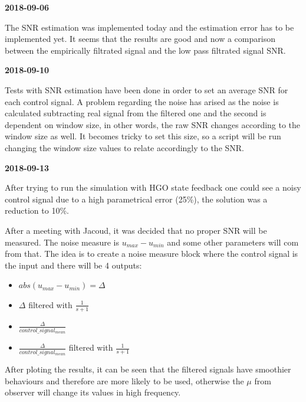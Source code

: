 \textbf{2018-09-06}

The SNR estimation was implemented today and the estimation error has to be implemented yet. It seems that the results are good and now a comparison between the empirically filtrated signal and the low pass filtrated signal SNR.

\textbf{2018-09-10}

Tests with SNR estimation have been done in order to set an average SNR for each control signal. A problem regarding the noise has arised as the noise is calculated subtracting real signal from the filtered one and the second is dependent on window size, in other words, the raw SNR changes according to the window size as well. It becomes tricky to set this size, so a script will be run changing the window size values to relate accordingly to the SNR.

\textbf{2018-09-13}

After trying to run the simulation with HGO state feedback one could see a noisy control signal due to a high parametrical error (25\%), the solution was a reduction to 10\%.

After a meeting with Jacoud, it was decided that no proper SNR will be measured. The noise measure is $u_{max} - u_{min}$ and some other parameters will com from that. The idea is to create a noise measure block where the control signal is the input and there will be 4 outputs:
\begin{itemize}
    \item $abs(u_{max} - u_{min}) = \Delta$
    \item $\Delta$ filtered with $\frac{1}{s + 1}$
    \item $\frac{\Delta}{control\_signal_{mean}}$
    \item $\frac{\Delta}{control\_signal_{mean}}$ filtered with $\frac{1}{s + 1}$
\end{itemize}

After ploting the results, it can be seen that the filtered signals have smoothier behaviours and therefore are more likely to be used, otherwise the $\mu$ from observer will change its values in high frequency.
